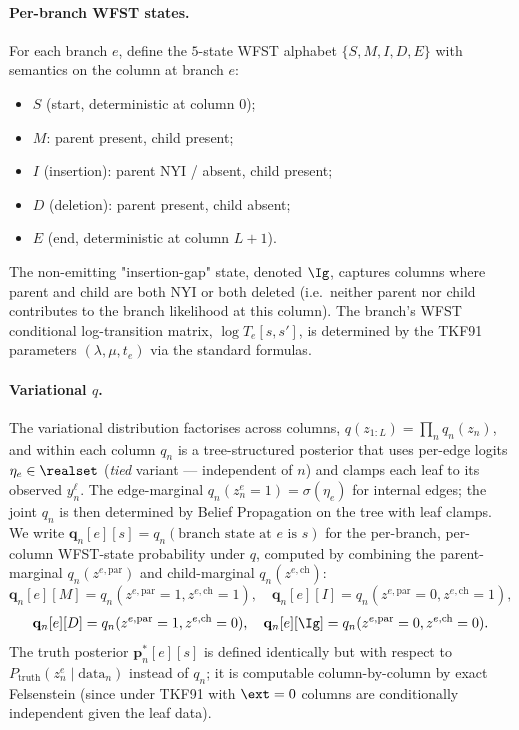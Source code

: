 \paragraph{Per-branch WFST states.}
For each branch $e$, define the $5$-state WFST alphabet
$\{S, M, I, D, E\}$ with semantics on the column at branch $e$:
\begin{itemize}[nosep]
\item $S$ (start, deterministic at column $0$);
\item $M$: parent present, child present;
\item $I$ (insertion): parent NYI / absent, child present;
\item $D$ (deletion): parent present, child absent;
\item $E$ (end, deterministic at column $L+1$).
\end{itemize}
The non-emitting "insertion-gap" state, denoted $\Ig$, captures
columns where parent and child are both NYI or both deleted (i.e.\
neither parent nor child contributes to the branch likelihood at
this column).  The branch's WFST conditional log-transition
matrix, $\log T_e[s, s']$, is determined by the TKF91 parameters
$(\lambda, \mu, t_e)$ via the standard formulas.

\paragraph{Variational $q$.}
The variational distribution factorises across columns,
$q(z_{1:L}) = \prod_n q_n(z_n)$, and within each column $q_n$ is
a tree-structured posterior that uses per-edge logits
$\eta_e \in \realset$ (\emph{tied} variant — independent of $n$)
and clamps each leaf to its observed $y_n^\ell$.  The
edge-marginal $q_n(z_n^e = 1) = \sigma(\eta_e)$ for internal
edges; the joint $q_n$ is then determined by Belief Propagation
on the tree with leaf clamps.  We write $\mathbf{q}_n[e][s] =
q_n(\text{branch state at } e \text{ is } s)$ for the per-branch,
per-column WFST-state probability under $q$, computed by
combining the parent-marginal $q_n(z^{e,\text{par}})$ and
child-marginal $q_n(z^{e,\text{ch}})$:
\begin{equation}
\mathbf{q}_n[e][M] = q_n(z^{e,\text{par}} = 1, z^{e,\text{ch}} = 1),
\quad
\mathbf{q}_n[e][I] = q_n(z^{e,\text{par}} = 0, z^{e,\text{ch}} = 1),
\end{equation}
\begin{equation}
\mathbf{q}_n[e][D] = q_n(z^{e,\text{par}} = 1, z^{e,\text{ch}} = 0),
\quad
\mathbf{q}_n[e][\Ig] = q_n(z^{e,\text{par}} = 0, z^{e,\text{ch}} = 0).
\end{equation}
The truth posterior $\mathbf{p}^*_n[e][s]$ is defined identically
but with respect to $P_{\text{truth}}(z_n^e \mid \text{data}_n)$
instead of $q_n$; it is computable column-by-column by exact
Felsenstein (since under TKF91 with $\ext = 0$ columns are
conditionally independent given the leaf data).

